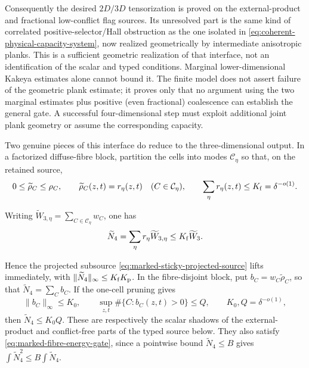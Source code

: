 \documentclass[11pt]{article}
\begin{document}
Consequently the desired \(2D/3D\) tensorization is proved on the
external-product and fractional low-conflict flag sources.  Its unresolved
part is the same kind of correlated positive-selector/Hall obstruction as
the one isolated in \eqref{eq:coherent-physical-capacity-system}, now
realized geometrically by intermediate anisotropic planks.  This is a
sufficient geometric realization of that interface, not an identification
of the scalar and typed conditions.  Marginal lower-dimensional Kakeya
estimates alone cannot bound it.
The finite model does not assert failure of the geometric plank estimate;
it proves only that no argument using the two marginal estimates plus
positive (even fractional) coalescence can establish the general gate.  A
successful four-dimensional step must exploit additional joint plank
geometry or assume the corresponding capacity.

Two genuine pieces of this interface do reduce to the three-dimensional
output.  In a factorized diffuse-fibre block, partition the cells into modes
\(\mathcal C_\eta\) so that, on the retained source,
\begin{equation}\label{eq:factorized-diffuse-fibre-block}
 0\le\widetilde\rho_C\le\rho_C,
 \qquad
 \widetilde\rho_C(z,t)=r_\eta(z,t)
 \quad(C\in\mathcal C_\eta),
 \qquad
 \sum_\eta r_\eta(z,t)\le K_{\rm f}=\delta^{-o(1)}.
\end{equation}

Writing \(\widetilde W_{3,\eta}
=\sum_{C\in\mathcal C_\eta}w_C\), one has
\begin{equation}\label{eq:factorized-fibre-lift}
 \widetilde N_4=\sum_\eta r_\eta \widetilde W_{3,\eta}
 \le K_{\rm f}\widetilde W_3.
\end{equation}

Hence the projected subsource
\eqref{eq:marked-sticky-projected-source} lifts immediately, with
\(\|\widetilde N_4\|_\infty\le K_{\rm f}K_{\rm p}\).  In the
fibre-disjoint block, put
\(b_C=w_C\widetilde\rho_C\), so that
\(\widetilde N_4=\sum_Cb_C\).  If the one-cell pruning gives
\begin{equation}\label{eq:fibre-disjoint-lift}
 \|b_C\|_\infty\le K_0,
 \qquad
 \sup_{z,t}\#\{C:b_C(z,t)>0\}\le Q,
 \qquad K_0,Q=\delta^{-o(1)},
\end{equation}
then \(\widetilde N_4\le K_0Q\).  These are respectively the scalar shadows of
the external-product and conflict-free parts of the typed source below.  They
also satisfy \eqref{eq:marked-fibre-energy-gate}, since a pointwise bound
\(\widetilde N_4\le B\) gives
\(\int\widetilde N_4^2\le B\int\widetilde N_4\).
\end{document}
